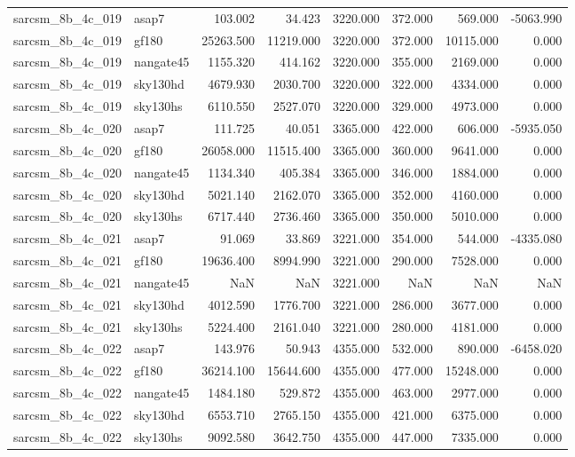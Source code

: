 \begin{tabular}{llrrrrrr}
sarcsm\_8b\_4c\_019 & asap7 & 103.002 & 34.423 & 3220.000 & 372.000 & 569.000 & -5063.990 \\
sarcsm\_8b\_4c\_019 & gf180 & 25263.500 & 11219.000 & 3220.000 & 372.000 & 10115.000 & 0.000 \\
sarcsm\_8b\_4c\_019 & nangate45 & 1155.320 & 414.162 & 3220.000 & 355.000 & 2169.000 & 0.000 \\
sarcsm\_8b\_4c\_019 & sky130hd & 4679.930 & 2030.700 & 3220.000 & 322.000 & 4334.000 & 0.000 \\
sarcsm\_8b\_4c\_019 & sky130hs & 6110.550 & 2527.070 & 3220.000 & 329.000 & 4973.000 & 0.000 \\
sarcsm\_8b\_4c\_020 & asap7 & 111.725 & 40.051 & 3365.000 & 422.000 & 606.000 & -5935.050 \\
sarcsm\_8b\_4c\_020 & gf180 & 26058.000 & 11515.400 & 3365.000 & 360.000 & 9641.000 & 0.000 \\
sarcsm\_8b\_4c\_020 & nangate45 & 1134.340 & 405.384 & 3365.000 & 346.000 & 1884.000 & 0.000 \\
sarcsm\_8b\_4c\_020 & sky130hd & 5021.140 & 2162.070 & 3365.000 & 352.000 & 4160.000 & 0.000 \\
sarcsm\_8b\_4c\_020 & sky130hs & 6717.440 & 2736.460 & 3365.000 & 350.000 & 5010.000 & 0.000 \\
sarcsm\_8b\_4c\_021 & asap7 & 91.069 & 33.869 & 3221.000 & 354.000 & 544.000 & -4335.080 \\
sarcsm\_8b\_4c\_021 & gf180 & 19636.400 & 8994.990 & 3221.000 & 290.000 & 7528.000 & 0.000 \\
sarcsm\_8b\_4c\_021 & nangate45 & NaN & NaN & 3221.000 & NaN & NaN & NaN \\
sarcsm\_8b\_4c\_021 & sky130hd & 4012.590 & 1776.700 & 3221.000 & 286.000 & 3677.000 & 0.000 \\
sarcsm\_8b\_4c\_021 & sky130hs & 5224.400 & 2161.040 & 3221.000 & 280.000 & 4181.000 & 0.000 \\
sarcsm\_8b\_4c\_022 & asap7 & 143.976 & 50.943 & 4355.000 & 532.000 & 890.000 & -6458.020 \\
sarcsm\_8b\_4c\_022 & gf180 & 36214.100 & 15644.600 & 4355.000 & 477.000 & 15248.000 & 0.000 \\
sarcsm\_8b\_4c\_022 & nangate45 & 1484.180 & 529.872 & 4355.000 & 463.000 & 2977.000 & 0.000 \\
sarcsm\_8b\_4c\_022 & sky130hd & 6553.710 & 2765.150 & 4355.000 & 421.000 & 6375.000 & 0.000 \\
sarcsm\_8b\_4c\_022 & sky130hs & 9092.580 & 3642.750 & 4355.000 & 447.000 & 7335.000 & 0.000 \\

\end{tabular}
